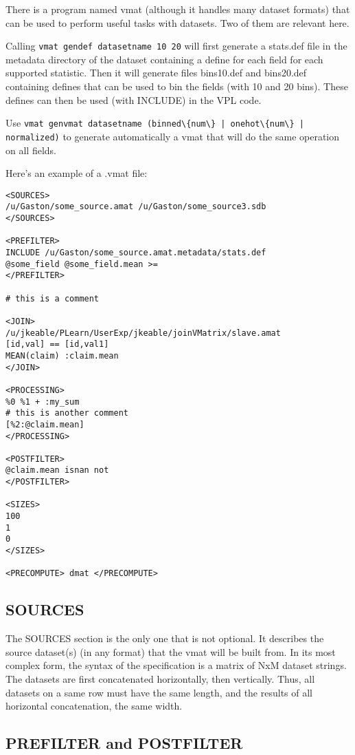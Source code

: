 \documentclass[11pt]{book}
\begin{document}
There is a program named vmat (although it handles many dataset formats) that can be used to perform useful tasks with datasets. Two of them are relevant here. 

Calling \verb!vmat gendef datasetname 10 20! will first generate a stats.def file in the metadata directory of the dataset containing a define for each field for each supported statistic. Then it will generate files bins10.def and bins20.def containing defines that can be used to bin the fields (with 10 and 20 bins). These defines can then be used (with INCLUDE) in the VPL code.

Use \verb!vmat genvmat datasetname (binned\{num\} | onehot\{num\} | normalized)! to generate automatically a vmat that will do the same operation on all fields.

Here's an example of a .vmat file:
\begin{verbatim}
<SOURCES>
/u/Gaston/some_source.amat /u/Gaston/some_source3.sdb
</SOURCES>

<PREFILTER>
INCLUDE /u/Gaston/some_source.amat.metadata/stats.def
@some_field @some_field.mean >=
</PREFILTER>

# this is a comment

<JOIN>
/u/jkeable/PLearn/UserExp/jkeable/joinVMatrix/slave.amat
[id,val] == [id,val1]
MEAN(claim) :claim.mean
</JOIN>

<PROCESSING>
%0 %1 + :my_sum
# this is another comment
[%2:@claim.mean]
</PROCESSING>

<POSTFILTER>
@claim.mean isnan not
</POSTFILTER>

<SIZES>
100
1
0
</SIZES>

<PRECOMPUTE> dmat </PRECOMPUTE>
\end{verbatim}


\subsection{SOURCES}
The SOURCES section is the only one that is not optional. It describes the source dataset(s) (in any format) that the vmat will be built from. In its most complex form, the syntax of the specification is a matrix of NxM dataset strings. The datasets are first concatenated horizontally, then vertically. Thus, all datasets on a same row must have the same length, and the results of all horizontal concatenation, the same width.

\subsection{PREFILTER and POSTFILTER}
\end{document}
